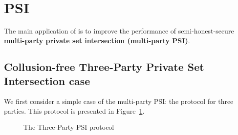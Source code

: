 \section{PSI}
\label{sec:psi}
The main application of \OPPRF is to improve the performance of semi-honest-secure \textbf{multi-party private set intersection (multi-party PSI)}. 
\subsection{Collusion-free Three-Party Private Set Intersection case}
\label{sect:3psi-construction}
We first consider a simple case of the multi-party PSI: the protocol for three parties. This protocol is presented in Figure~\ref{fig:3psi}. 

\begin{figure}[h]\centering
{}
\caption{The Three-Party PSI protocol}
\label{fig:3psi}
\end{figure}